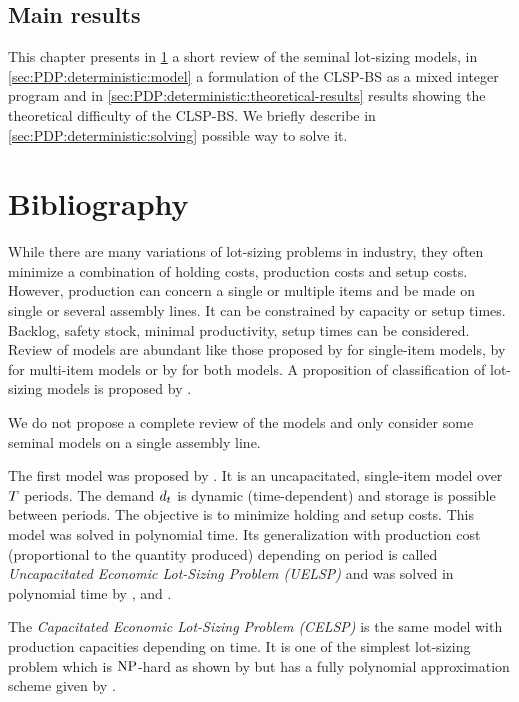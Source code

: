 \subsection{Main results}
\label{sec:PDP:deterministic:introduction:main-results}


This chapter presents in \cref{sec:PDP:deterministic:bibliography} a short review of the seminal lot-sizing models, in \cref{sec:PDP:deterministic:model} a formulation of the CLSP-BS as a mixed integer program and in \cref{sec:PDP:deterministic:theoretical-results} results showing the theoretical difficulty of the CLSP-BS.
We briefly describe in \cref{sec:PDP:deterministic:solving} possible way to solve it.


\section{Bibliography}
\label{sec:PDP:deterministic:bibliography}


While there are many variations of lot-sizing problems in industry, they often minimize a combination of holding costs, production costs and setup costs.
However, production can concern a single or multiple items and be made on single or several assembly lines.
It can be constrained by capacity or setup times.
Backlog, safety stock, minimal productivity, setup times can be considered.
Review of models are abundant like those proposed by \citet{Geunes2014} for single-item models, by \citet{Gicquel2008} for multi-item models or by \citet{Karimi2003} for both models.
A proposition of classification of lot-sizing models is proposed by \citet[Chapter 4 and 12]{Pochet2006}.


We do not propose a complete review of the models and only consider some seminal models on a single assembly line.


The first model was proposed by \citet{Wagner1958}.
It is an uncapacitated, single-item model over $T$ periods.
The demand $d_t$ is dynamic (\ie time-dependent) and storage is possible between periods.
The objective is to minimize holding and setup costs.
This model was solved in polynomial time.
Its generalization with production cost (proportional to the quantity produced) depending on period is called \emph{Uncapacitated Economic Lot-Sizing Problem (UELSP)} and was solved in polynomial time by \citet{Federgruen1991}, \citet{Wagelmans1992} and \citet{Aggarwal1993}.


The \emph{Capacitated Economic Lot-Sizing Problem (CELSP)} is the same model with production capacities depending on time.
It is one of the simplest lot-sizing problem which is $\operatorname{NP}$-hard as shown by \citet{Florian1980} but has a fully polynomial approximation scheme given by \citet{vanHoesel2001}.


